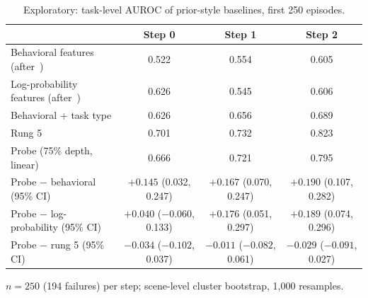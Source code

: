 \begin{table}[htbp]
\centering\small
\caption{Exploratory: task-level AUROC of prior-style baselines, first 250 episodes.}\label{tab:prior}
\begin{tabularx}{\linewidth}{@{}Lccc@{}}
\toprule
 & Step 0 & Step 1 & Step 2 \\
\midrule
Behavioral features (after~\cite{ruan2026doomed}) & 0.522 & 0.554 & 0.605 \\
Log-probability features (after~\cite{pham2026agentstop}) & 0.626 & 0.545 & 0.606 \\
Behavioral + task type & 0.626 & 0.656 & 0.689 \\
Rung 5 & 0.701 & 0.732 & 0.823 \\
Probe (75\% depth, linear) & 0.666 & 0.721 & 0.795 \\
\addlinespace
Probe $-$ behavioral (95\% CI) & $+0.145$ (0.032, 0.247) & $+0.167$ (0.070, 0.247) & $+0.190$ (0.107, 0.282) \\
Probe $-$ log-probability (95\% CI) & $+0.040$ ($-0.060$, 0.133) & $+0.176$ (0.051, 0.297) & $+0.189$ (0.074, 0.296) \\
Probe $-$ rung 5 (95\% CI) & $-0.034$ ($-0.102$, 0.037) & $-0.011$ ($-0.082$, 0.061) & $-0.029$ ($-0.091$, 0.027) \\
\bottomrule
\end{tabularx}
\par\smallskip\raggedright\footnotesize
$n = 250$ (194 failures) per step; scene-level cluster bootstrap, 1,000 resamples.
\end{table}
